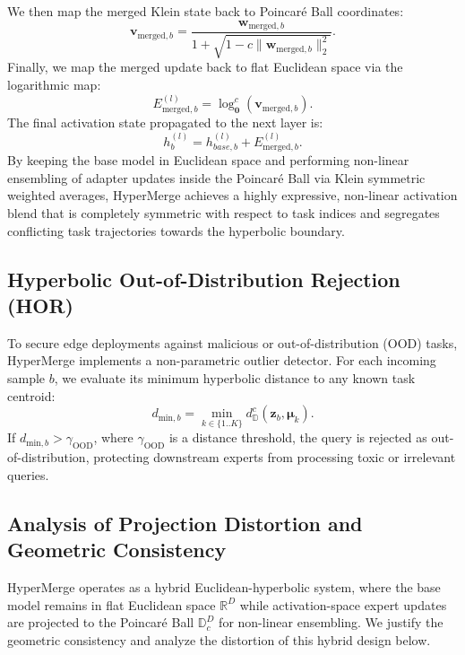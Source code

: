 We then map the merged Klein state back to Poincaré Ball coordinates:
\begin{equation}
\mathbf{v}_{\text{merged}, b} = \frac{\mathbf{w}_{\text{merged}, b}}{1 + \sqrt{1 - c \|\mathbf{w}_{\text{merged}, b}\|_2^2}}.
\end{equation}
Finally, we map the merged update back to flat Euclidean space via the logarithmic map:
\begin{equation}
E_{\text{merged}, b}^{(l)} = \log_{\mathbf{0}}^c\left( \mathbf{v}_{\text{merged}, b} \right).
\end{equation}
The final activation state propagated to the next layer is:
\begin{equation}
h_b^{(l)} = h_{base, b}^{(l)} + E_{\text{merged}, b}^{(l)}.
\end{equation}
By keeping the base model in Euclidean space and performing non-linear ensembling of adapter updates inside the Poincaré Ball via Klein symmetric weighted averages, HyperMerge achieves a highly expressive, non-linear activation blend that is completely symmetric with respect to task indices and segregates conflicting task trajectories towards the hyperbolic boundary.

\subsection{Hyperbolic Out-of-Distribution Rejection (HOR)}
To secure edge deployments against malicious or out-of-distribution (OOD) tasks, HyperMerge implements a non-parametric outlier detector. For each incoming sample $b$, we evaluate its minimum hyperbolic distance to any known task centroid:
\begin{equation}
d_{\text{min}, b} = \min_{k \in \{1..K\}} d_{\mathbb{D}}^c(\mathbf{z}_b, \boldsymbol{\mu}_k).
\end{equation}
If $d_{\text{min}, b} > \gamma_{\text{OOD}}$, where $\gamma_{\text{OOD}}$ is a distance threshold, the query is rejected as out-of-distribution, protecting downstream experts from processing toxic or irrelevant queries.

\subsection{Analysis of Projection Distortion and Geometric Consistency}
HyperMerge operates as a hybrid Euclidean-hyperbolic system, where the base model remains in flat Euclidean space $\mathbb{R}^D$ while activation-space expert updates are projected to the Poincaré Ball $\mathbb{D}_c^D$ for non-linear ensembling. We justify the geometric consistency and analyze the distortion of this hybrid design below.

